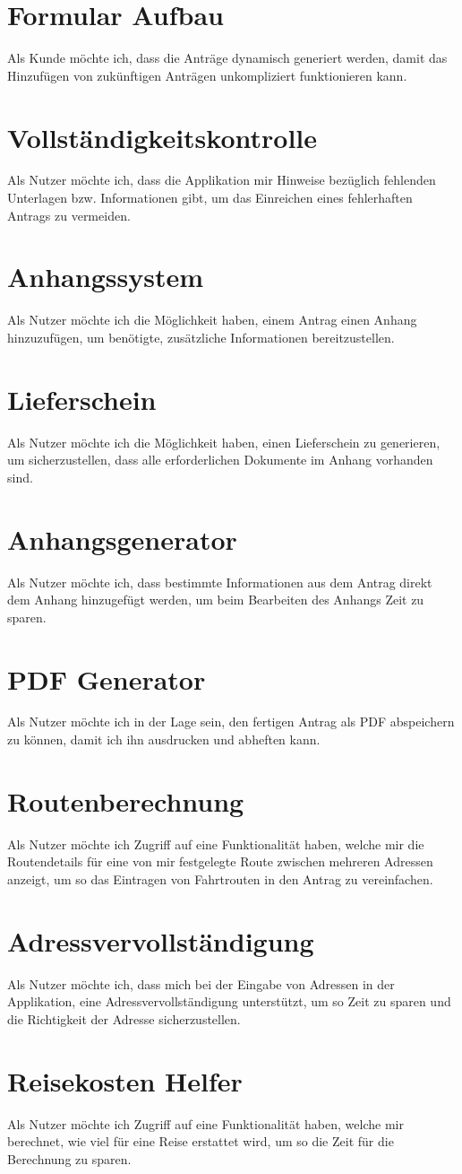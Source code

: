 \section{Formular Aufbau}
Als Kunde möchte ich, dass die Anträge dynamisch generiert werden, damit das Hinzufügen von zukünftigen
Anträgen unkompliziert funktionieren kann.
\section{Vollständigkeitskontrolle}
Als Nutzer möchte ich, dass die Applikation mir Hinweise bezüglich fehlenden Unterlagen bzw. 
Informationen gibt, um das Einreichen eines fehlerhaften Antrags zu vermeiden.
\section{Anhangssystem}
Als Nutzer möchte ich die Möglichkeit haben, einem Antrag einen Anhang hinzuzufügen, um benötigte, 
zusätzliche Informationen bereitzustellen.
\section{Lieferschein}
Als Nutzer möchte ich die Möglichkeit haben, einen Lieferschein zu generieren, um sicherzustellen, 
dass alle erforderlichen Dokumente im Anhang vorhanden sind.
\section{Anhangsgenerator}
Als Nutzer möchte ich, dass bestimmte Informationen aus dem Antrag direkt dem Anhang hinzugefügt 
werden, um beim Bearbeiten des Anhangs Zeit zu sparen.
\section{\ac{PDF} Generator}
Als Nutzer möchte ich in der Lage sein, den fertigen Antrag als \ac{PDF} abspeichern zu können,
damit ich ihn ausdrucken und abheften kann.
\section{Routenberechnung}
Als Nutzer möchte ich Zugriff auf eine Funktionalität haben, welche mir die Routendetails für eine von mir festgelegte
Route zwischen mehreren Adressen anzeigt, um so das Eintragen von Fahrtrouten in den Antrag zu vereinfachen.
\section{Adressvervollständigung}
Als Nutzer möchte ich, dass mich bei der Eingabe von Adressen in der Applikation, eine 
Adressvervollständigung unterstützt, um so Zeit zu sparen und die Richtigkeit der 
Adresse sicherzustellen.
\section{Reisekosten Helfer}
Als Nutzer möchte ich Zugriff auf eine Funktionalität haben, welche mir berechnet, wie viel für eine 
Reise erstattet wird, um so die Zeit für die Berechnung zu sparen.